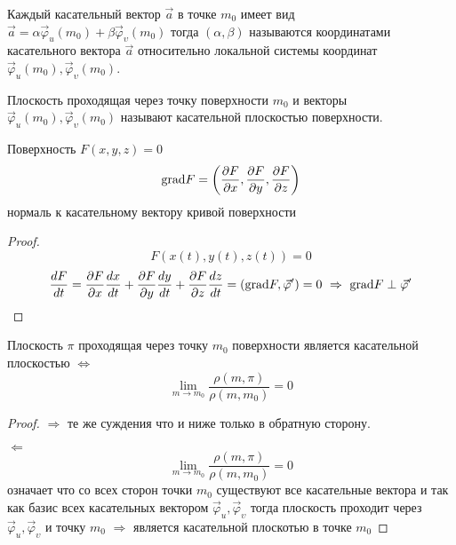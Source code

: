 \begin{define}
  Каждый касательный вектор $\vec a$ в точке $m_0$ имеет вид $\vec a =
  \alpha \vec \varphi_u(m_0) + \beta \vec \varphi_{\upsilon}(m_0)$ тогда
  $(\alpha, \beta)$ называются
  координатами касательного вектора $\vec a$ относительно локальной системы
  координат $\vec \varphi_u(m_0), \vec \varphi_{\upsilon}(m_0)$.
\end{define}

\begin{define}
  Плоскость проходящая через точку поверхности $m_0$ и векторы
  $\vec \varphi_u (m_0), \vec \varphi_{\upsilon}(m_0)$ называют касательной
  плоскостью поверхности.
\end{define}

\begin{theorem}
  Поверхность $F(x,y,z) = 0$
  $$
  \mathrm{grad} F = \left( \frac{\partial F}{\partial x},
  \frac{\partial F}{\partial y},
  \frac{\partial F}{\partial z}
   \right)
  $$
  нормаль к касательному вектору кривой поверхности
\end{theorem}

\begin{proof}
  $$
  F(x(t), y(t), z(t)) = 0
  $$
  $$
  \frac{dF}{dt} =
  \frac{\partial F}{\partial x} \frac{dx}{dt} +
  \frac{\partial F}{\partial y}\frac{dy}{dt} +
  \frac{\partial F}{\partial z}\frac{dz}{dt} =
  (\mathrm{grad} F, \vec \varphi') = 0 ~ \Rightarrow ~ \mathrm{grad} F \perp \vec \varphi'
  $$
\end{proof}

\begin{theorem}
  Плоскость $\pi$ проходящая через точку $m_0$ поверхности является касательной
  плоскостью $\Leftrightarrow$
  $$
  \lim_{m \to m_0} \frac{\rho (m, \pi)}{\rho(m, m_0)} = 0
  $$
\end{theorem}

\begin{proof}
  $\Rightarrow$ те же суждения что и ниже только в обратную сторону.

  $\Leftarrow$
  $$
  \lim_{m \to m_0} \frac{\rho (m, \pi)}{\rho(m, m_0)} = 0
  $$
  означает что со всех сторон точки $m_0$ существуют все касательные вектора
  и так как базис всех касательных вектором $\vec \varphi_u,
  \vec \varphi_{\upsilon}$ тогда плоскость проходит через $\vec \varphi_u,
  \vec \varphi_{\upsilon}$ и точку $m_0$ $\Rightarrow$ является касательной
  плоскотью в точке $m_0$
\end{proof}